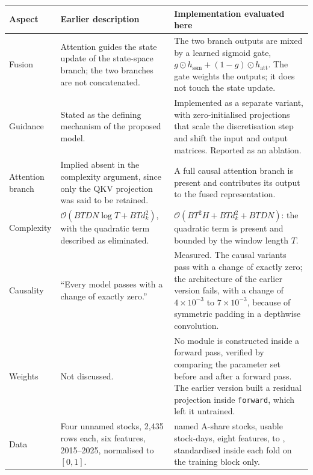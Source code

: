 \small
\setlength{\tabcolsep}{4pt}
\begin{tabularx}{\textwidth}{@{}>{\raggedright\arraybackslash}p{}
	>{\raggedright\arraybackslash}X>{\raggedright\arraybackslash}X@{}}
	\toprule
	\textbf{Aspect} & \textbf{Earlier description} & \textbf{Implementation evaluated here} \\
	\midrule
	Fusion & Attention guides the state update of the state-space branch; the two branches are not
	concatenated. &
	The two branch outputs are mixed by a learned sigmoid gate,
	$g \odot h_{\text{ssm}} + (1-g)\odot h_{\text{att}}$. The gate weights the outputs; it does not
	touch the state update. \\
	\addlinespace
	Guidance & Stated as the defining mechanism of the proposed model. &
	Implemented as a separate variant, with zero-initialised projections that scale the
	discretisation step and shift the input and output matrices. Reported as an ablation. \\
	\addlinespace
	Attention branch & Implied absent in the complexity argument, since only the QKV projection was
	said to be retained. &
	A full causal attention branch is present and contributes its output to the fused representation. \\
	\addlinespace
	Complexity & $\mathcal{O}(B T D N \log T + B T d_k^2)$, with the quadratic term described as
	eliminated. &
	$\mathcal{O}(B T^2 H + B T d_k^2 + B T D N)$: the quadratic term is present and bounded by the
	window length $T$. \\
	\addlinespace
	Causality & ``Every model passes with a change of exactly zero.'' &
	Measured. The causal variants pass with a change of exactly zero; the architecture of the earlier
	version fails, with a change of $4\times10^{-3}$ to $7\times10^{-3}$, because of symmetric
	padding in a depthwise convolution. \\
	\addlinespace
	Weights & Not discussed. &
	No module is constructed inside a forward pass, verified by comparing the parameter set before
	and after a forward pass. The earlier version built a residual projection inside
	\texttt{forward}, which left it untrained. \\
	\addlinespace
	Data & Four unnamed stocks, 2{,}435 rows each, six features, 2015--2025, normalised to $[0,1]$. &
	\nStocks{} named A-share stocks, \nStockDays{} usable stock-days, eight features, \firstDate{} to
	\lastDate{}, standardised inside each fold on the training block only. \\
	\bottomrule
\end{tabularx}
